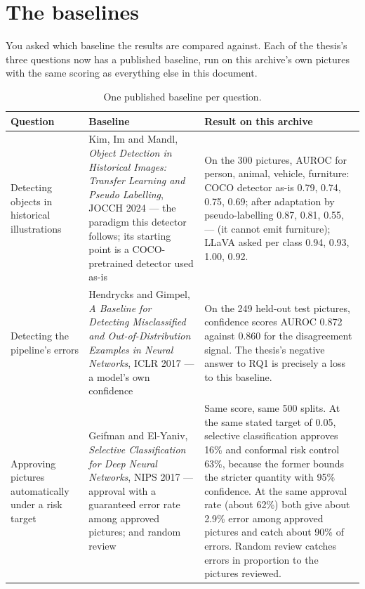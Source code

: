 \documentclass[11pt,a4paper]{article}
\begin{document}
\section{The baselines}

You asked which baseline the results are compared against. Each of the thesis's three questions
now has a published baseline, run on this archive's own pictures with the same scoring as everything
else in this document.

\begin{table}[h]
\centering
\small
\begin{tabular}{>{\raggedright\arraybackslash}p{3.1cm}>{\raggedright\arraybackslash}p{4.3cm}>{\raggedright\arraybackslash}p{6.6cm}}
\toprule
Question & Baseline & Result on this archive \\
\midrule
Detecting objects in historical illustrations &
Kim, Im and Mandl, \emph{Object Detection in Historical Images: Transfer Learning and Pseudo
Labelling}, JOCCH 2024 --- the paradigm this detector follows; its starting point is a COCO-pretrained
detector used as-is &
On the 300 pictures, AUROC for person, animal, vehicle, furniture: COCO detector as-is 0.79, 0.74,
0.75, 0.69; after adaptation by pseudo-labelling 0.87, 0.81, 0.55, --- (it cannot emit furniture);
LLaVA asked per class 0.94, 0.93, 1.00, 0.92. \\
\addlinespace
Detecting the pipeline's errors &
Hendrycks and Gimpel, \emph{A Baseline for Detecting Misclassified and Out-of-Distribution Examples
in Neural Networks}, ICLR 2017 --- a model's own confidence &
On the 249 held-out test pictures, confidence scores AUROC 0.872 against 0.860 for the disagreement
signal. The thesis's negative answer to RQ1 is precisely a loss to this baseline. \\
\addlinespace
Approving pictures automatically under a risk target &
Geifman and El-Yaniv, \emph{Selective Classification for Deep Neural Networks}, NIPS 2017 ---
approval with a guaranteed error rate among approved pictures; and random review &
Same score, same 500 splits. At the same stated target of 0.05, selective classification approves
16\% and conformal risk control 63\%, because the former bounds the stricter quantity with 95\%
confidence. At the same approval rate (about 62\%) both give about 2.9\% error among approved
pictures and catch about 90\% of errors. Random review catches errors in proportion to the pictures
reviewed. \\
\bottomrule
\end{tabular}
\caption{One published baseline per question.}
\end{table}
\end{document}
